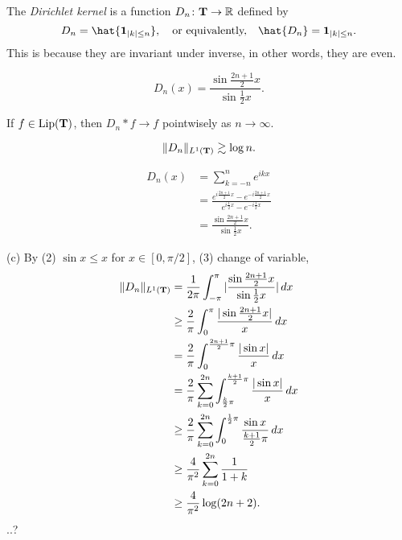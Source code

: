 \documentclass{../../large}
\begin{document}
\begin{prb}
The \emph{Dirichlet kernel} is a function $D_n\colon \mathbf{T}\to\mathbb{R}$ defined by
\[D_n=\hat{\1_{|k|\le n}},\quad\text{or equivalently,}\quad\hat{D_n}=\1_{|k|\le n}.\]
This is because they are invariant under inverse, in other words, they are even.
\begin{parts}
\item
\[D_n(x)=\frac{\sin\frac{2n+1}2x}{\sin\frac12x}.\]
\item If $f\in\operatorname{Lip}(\mathbf{T})$, then $D_n*f\to f$ pointwisely as $n\to\infty$.
\item
\[\|D_n\|_{L^1(\mathbf{T})}\gtrsim\log n.\]
\end{parts}
\end{prb}

\begin{pf}
\begin{align*}
D_n(x)&=\sum_{k=-n}^ne^{ikx}\\
&=\frac{e^{i\frac{2n+1}2x}-e^{-i\frac{2n+1}2x}}{e^{i\frac12x}-e^{-i\frac12x}}\\
&=\frac{\sin\frac{2n+1}2x}{\sin\frac12x}.
\end{align*}

(c)
By (2) $\sin x\le x$ for $x\in[0,\pi/2]$, (3) change of variable,
\begin{align*}
\|D_n\|_{L^1(\mathbf{T})}
&=\frac1{2\pi}\int_{-\pi}^\pi|\frac{\sin\frac{2n+1}2x}{\sin\frac12x}|\,dx\\
&\ge\frac2\pi\int_0^\pi\frac{|\sin\frac{2n+1}2x|}x\,dx\\
&=\frac2\pi\int_0^{\frac{2n+1}2\pi}\frac{|\sin x|}x\,dx\\
&=\frac2\pi\sum_{k=0}^{2n}\int_{\frac k2\pi}^{\frac{k+1}2\pi}\frac{|\sin x|}x\,dx\\
&\ge\frac2\pi\sum_{k=0}^{2n}\int_0^{\frac12\pi}\frac{\sin x}{\frac{k+1}2\pi}\,dx\\
&\ge\frac4{\pi^2}\sum_{k=0}^{2n}\frac1{1+k}\\
&\ge\frac4{\pi^2}\log(2n+2).
\end{align*}
..?
\end{pf}
\end{document}
